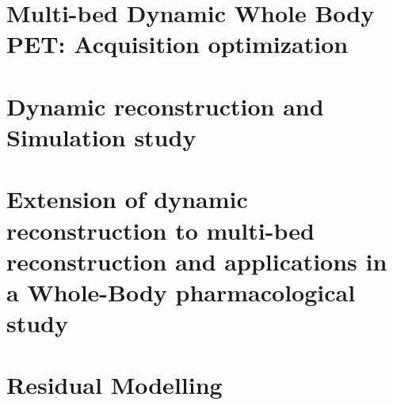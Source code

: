 
\chapter{Multi-bed Dynamic Whole Body PET: Acquisition optimization}
\label{Chap3_1:AcquisitionOptimization}


\chapter{Dynamic reconstruction and Simulation study}
\label{Chap3_2:SimStudy}


\chapter{Extension of dynamic reconstruction to multi-bed reconstruction and applications in a Whole-Body pharmacological study}
\label{Chap3_3:IsotoPK}


\chapter{Residual Modelling}
\label{Chap3_4:Residual}
